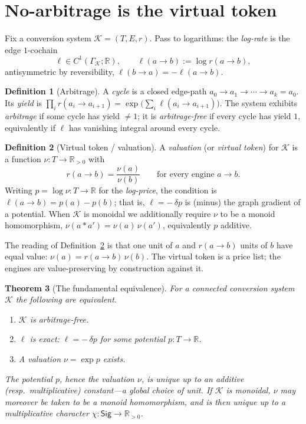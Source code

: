 \documentclass[11pt]{article}
\theoremstyle{definition}
\newtheorem{definition}{Definition}[section]
\theoremstyle{plain}
\newtheorem{theorem}[definition]{Theorem}
\theoremstyle{remark}
\newcommand{\Sig}{\mathsf{Sig}}
\newcommand{\Tok}{T}
\newcommand{\Real}{\mathbb{R}}
\newcommand{\Rpos}{\mathbb{R}_{>0}}
\begin{document}
\section{No-arbitrage is the virtual token}
\label{sec:noarb}

Fix a conversion system $\mathcal K=(\Tok,E,r)$. Pass to logarithms: the \emph{log-rate} is the
edge $1$-cochain
\[
  \ell\in C^1(\Gamma_{\mathcal K};\Real),\qquad \ell(a\!\to\! b):=\log r(a\!\to\! b),
\]
antisymmetric by reversibility, $\ell(b\!\to\! a)=-\ell(a\!\to\! b)$.

\begin{definition}[Arbitrage]\label{def:arb}
A \emph{cycle} is a closed edge-path $a_0\!\to\! a_1\!\to\!\cdots\!\to\! a_k=a_0$. Its
\emph{yield} is $\prod_{i} r(a_i\!\to\! a_{i+1})=\exp\!\big(\sum_i \ell(a_i\!\to\! a_{i+1})\big)$.
The system exhibits \emph{arbitrage} if some cycle has yield $\neq 1$; it is
\emph{arbitrage-free} if every cycle has yield $1$, equivalently if $\ell$ has vanishing
integral around every cycle.
\end{definition}

\begin{definition}[Virtual token / valuation]\label{def:val}
A \emph{valuation} (or \emph{virtual token}) for $\mathcal K$ is a function $\nu:\Tok\to\Rpos$
with
\[
  r(a\!\to\! b)=\frac{\nu(a)}{\nu(b)}\qquad\text{for every engine }a\!\to\! b .
\]
Writing $p=\log\nu:\Tok\to\Real$ for the \emph{log-price}, the condition is
$\ell(a\!\to\! b)=p(a)-p(b)$; that is, $\ell=-\,\delta p$ is (minus) the graph gradient of a
potential. When $\mathcal K$ is monoidal we additionally require $\nu$ to be a monoid
homomorphism, $\nu(a\ast a')=\nu(a)\,\nu(a')$, equivalently $p$ additive.
\end{definition}

The reading of Definition~\ref{def:val} is that one unit of $a$ and $r(a\!\to\! b)$ units of $b$
have equal value: $\nu(a)=r(a\!\to\! b)\,\nu(b)$. The virtual token is a price list; the engines
are value-preserving by construction against it.

\begin{theorem}[The fundamental equivalence]\label{thm:ftap}
For a connected conversion system $\mathcal K$ the following are equivalent.
\begin{enumerate}[label=\textup{(\roman*)}]
\item $\mathcal K$ is arbitrage-free.
\item $\ell$ is exact: $\ell=-\,\delta p$ for some potential $p:\Tok\to\Real$.
\item A valuation $\nu=\exp p$ exists.
\end{enumerate}
The potential $p$, hence the valuation $\nu$, is unique up to an additive (resp.\ multiplicative)
constant---a global choice of unit. If $\mathcal K$ is monoidal, $\nu$ may moreover be taken to
be a monoid homomorphism, and is then unique up to a multiplicative character
$\chi:\Sig\to\Rpos$.
\end{theorem}
\end{document}
